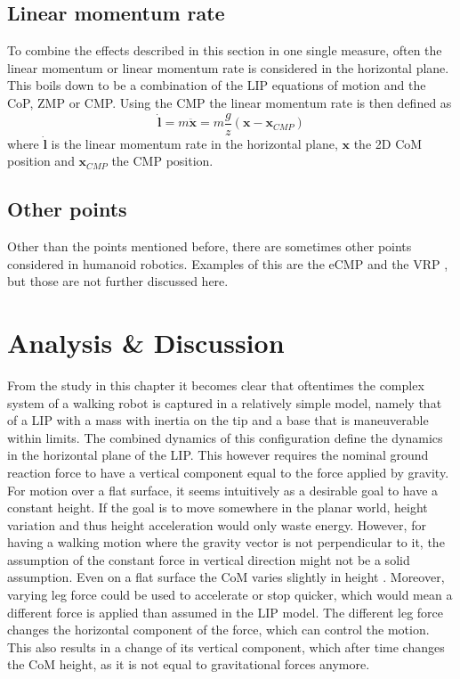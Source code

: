 \subsection{Linear momentum rate}
To combine the effects described in this section in one single measure, often the linear momentum or linear momentum rate is considered in the horizontal plane. This boils down to be a combination of the \ac{LIP} equations of motion and the \ac{CoP}, \ac{ZMP} or \ac{CMP}. Using the \ac{CMP} the linear momentum rate is then defined as
\begin{equation}
\boldsymbol{\dot{l}} = m\boldsymbol{\ddot{x}}= m\frac{g}{z}(\boldsymbol{x}-\boldsymbol{x}_{CMP})
\label{eq:ldot}
\end{equation}
where $\boldsymbol{\dot{l}}$ is the linear momentum rate in the horizontal plane, $\boldsymbol{x}$ the \ac{2D} \ac{CoM} position and $\boldsymbol{x}_{CMP}$ the \ac{CMP} position.
\subsection{Other points}
Other than the points mentioned before, there are sometimes other points considered in humanoid robotics. Examples of this are the \ac{eCMP} and the \ac{VRP} \cite{englsberger2013three}, but those are not further discussed here. 

\section{Analysis \& Discussion}
From the study in this chapter it becomes clear that oftentimes the complex system of a walking robot is captured in a relatively simple model, namely that of a \ac{LIP} with a mass with inertia on the tip and a base that is maneuverable within limits. The combined dynamics of this configuration define the dynamics in the horizontal plane of the \ac{LIP}. This however requires the nominal ground reaction force to have a vertical component equal to the force applied by gravity. For motion over a flat surface, it seems intuitively as a desirable goal to have a constant height. If the goal is to move somewhere in the planar world, height variation and thus height acceleration would only waste energy. However, for having a walking motion where the gravity vector is not perpendicular to it, the assumption of the constant force in vertical direction might not be a solid assumption. Even on a flat surface the \ac{CoM} varies slightly in height \cite{lee1998determinants}. Moreover, varying leg force could be used to accelerate or stop quicker, which would mean a different force is applied than assumed in the \ac{LIP} model. The different leg force changes the horizontal component of the force, which can control the motion. This also results in a change of its vertical component, which after time changes the \ac{CoM} height, as it is not equal to gravitational forces anymore.
